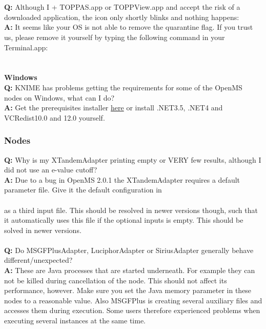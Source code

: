 \\\\
\textbf{Q:} Although I + TOPPAS.app or TOPPView.app and accept the risk of a downloaded application, the icon only shortly blinks and nothing happens:\\
\textbf{A:} It seems like your OS is not able to remove the quarantine flag. If you trust us, please remove it yourself by typing the following command in your Terminal.app:\\
\\\\
\textbf{Windows}\\
\textbf{Q:} KNIME has problems getting the requirements for some of the OpenMS nodes on Windows, what can I do?\\
\textbf{A:} Get the prerequisites installer \href{\WindowsPrerequisitesLink}{here} or install .NET3.5, .NET4 and VCRedist10.0 and 12.0 yourself.\\
\subsubsection{Nodes}
\textbf{Q:} Why is my XTandemAdapter printing empty or VERY few results, although I did not use an e-value cutoff?\\
\textbf{A:} Due to a bug in OpenMS 2.0.1 the XTandemAdapter requires a default parameter file. Give it the default configuration in\\
\\
 as a third input file. This should be resolved in newer versions though, such that it automatically uses this file if the optional inputs is empty. This should be solved in newer versions.
\\\\
\textbf{Q:} Do MSGFPlusAdapter, LuciphorAdapter or SiriusAdapter generally behave different/unexpected?\\
\textbf{A:} These are Java processes that are started underneath. For example they can not be killed during 
cancellation of the node.
This should not affect its performance, however. Make sure you set the Java memory parameter in these nodes to a reasonable value. Also MSGFPlus is creating several auxiliary files and accesses them during execution. 
Some users therefore experienced problems when executing several instances at the same time.
